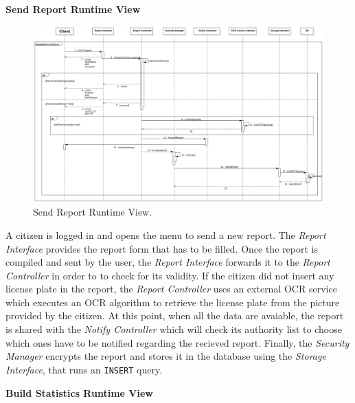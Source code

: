 \documentclass{report}
\begin{document}
\begin{center}\large{\textbf{Send Report Runtime View}}\end{center}
\begin{figure}[H]
	\begin{center}
	\includegraphics[width=\textwidth]{img/SendReport1.png}
    \end{center}
    \label{fig:SendReportSD}
	\caption{Send Report Runtime View.}
\end{figure}
A citizen is logged in and opens the menu to send a new report. The \textit{Report Interface} provides the report form that has to be filled. Once the report is compiled and sent by the user, the \textit{Report Interface} forwards it to the \textit{Report Controller} in order to to check for its validity. 
If the citizen did not insert any license plate in the report, the \textit{Report Controller} uses an external OCR service which executes an OCR algorithm to retrieve the license plate from the picture provided by the citizen.
At this point, when all the data are avaiable, the report is shared with the \textit{Notify Controller} which will check its authority list to choose which ones have to be notified regarding the recieved report.
Finally, the \textit{Security Manager} encrypts the report and stores it in the database using the \textit{Storage Interface}, that runs an \texttt{INSERT} query. 
\clearpage
\begin{center}\large{\textbf{Build Statistics Runtime View}}\end{center}
\end{document}
